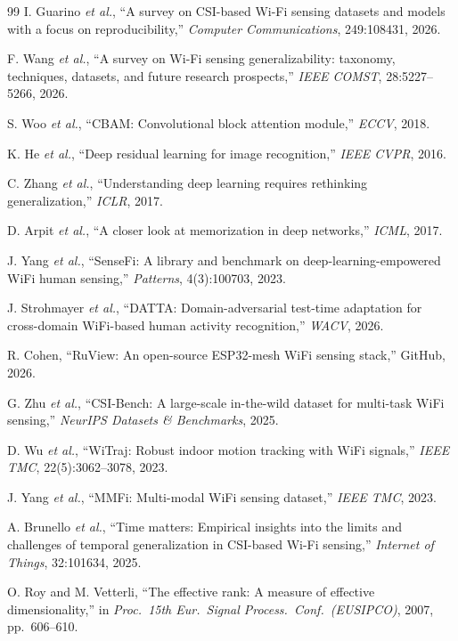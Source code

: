 \documentclass[journal,11pt]{IEEEtran}
\newcommand{\etal}{\textit{et al.}}
\begin{document}
\begin{thebibliography}{99}
 I. Guarino \etal, ``A survey on CSI-based Wi-Fi sensing datasets and models with a focus on reproducibility,'' \emph{Computer Communications}, 249:108431, 2026.

 F. Wang \etal, ``A survey on Wi-Fi sensing generalizability: taxonomy, techniques, datasets, and future research prospects,'' \emph{IEEE COMST}, 28:5227--5266, 2026.

 S. Woo \etal, ``CBAM: Convolutional block attention module,'' \emph{ECCV}, 2018.

 K. He \etal, ``Deep residual learning for image recognition,'' \emph{IEEE CVPR}, 2016.

 C. Zhang \etal, ``Understanding deep learning requires rethinking generalization,'' \emph{ICLR}, 2017.

 D. Arpit \etal, ``A closer look at memorization in deep networks,'' \emph{ICML}, 2017.

 J. Yang \etal, ``SenseFi: A library and benchmark on deep-learning-empowered WiFi human sensing,'' \emph{Patterns}, 4(3):100703, 2023.

 J. Strohmayer \etal, ``DATTA: Domain-adversarial test-time adaptation for cross-domain WiFi-based human activity recognition,'' \emph{WACV}, 2026.

 R. Cohen, ``RuView: An open-source ESP32-mesh WiFi sensing stack,'' GitHub, 2026.

 G. Zhu \etal, ``CSI-Bench: A large-scale in-the-wild dataset for multi-task WiFi sensing,'' \emph{NeurIPS Datasets \& Benchmarks}, 2025.

 D. Wu \etal, ``WiTraj: Robust indoor motion tracking with WiFi signals,'' \emph{IEEE TMC}, 22(5):3062--3078, 2023.

 J. Yang \etal, ``MMFi: Multi-modal WiFi sensing dataset,'' \emph{IEEE TMC}, 2023.

 A. Brunello \etal, ``Time matters: Empirical insights into the limits and challenges of temporal generalization in CSI-based Wi-Fi sensing,'' \emph{Internet of Things}, 32:101634, 2025.

 O. Roy and M. Vetterli, ``The effective rank: A measure of effective dimensionality,'' in \emph{Proc.\ 15th Eur.\ Signal Process.\ Conf.\ (EUSIPCO)}, 2007, pp.~606--610.


\end{thebibliography}
\end{document}
